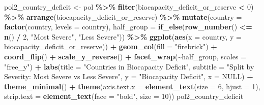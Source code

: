 \documentclass[
]{article}
\newenvironment{Shaded}{\begin{snugshade}}{\end{snugshade}}
\newcommand{\AttributeTok}[1]{\textcolor[rgb]{0.13,0.29,0.53}{#1}}
\newcommand{\ConstantTok}[1]{\textcolor[rgb]{0.56,0.35,0.01}{#1}}
\newcommand{\DecValTok}[1]{\textcolor[rgb]{0.00,0.00,0.81}{#1}}
\newcommand{\FunctionTok}[1]{\textcolor[rgb]{0.13,0.29,0.53}{\textbf{#1}}}
\newcommand{\NormalTok}[1]{#1}
\newcommand{\OtherTok}[1]{\textcolor[rgb]{0.56,0.35,0.01}{#1}}
\newcommand{\SpecialCharTok}[1]{\textcolor[rgb]{0.81,0.36,0.00}{\textbf{#1}}}
\newcommand{\StringTok}[1]{\textcolor[rgb]{0.31,0.60,0.02}{#1}}
\begin{document}
\begin{Shaded}
\begin{Highlighting}[]
\NormalTok{pol2\_country\_deficit }\OtherTok{\textless{}{-}}\NormalTok{ pol }\SpecialCharTok{\%\textgreater{}\%}
  \FunctionTok{filter}\NormalTok{(biocapacity\_deficit\_or\_reserve }\SpecialCharTok{\textless{}} \DecValTok{0}\NormalTok{) }\SpecialCharTok{\%\textgreater{}\%}
  \FunctionTok{arrange}\NormalTok{(biocapacity\_deficit\_or\_reserve) }\SpecialCharTok{\%\textgreater{}\%}
  \FunctionTok{mutate}\NormalTok{(}\AttributeTok{country =} \FunctionTok{factor}\NormalTok{(country, }\AttributeTok{levels =}\NormalTok{ country),}
         \AttributeTok{half\_group =} \FunctionTok{if\_else}\NormalTok{(}\FunctionTok{row\_number}\NormalTok{() }\SpecialCharTok{\textless{}=} \FunctionTok{n}\NormalTok{() }\SpecialCharTok{/} \DecValTok{2}\NormalTok{, }\StringTok{"Most Severe"}\NormalTok{, }\StringTok{"Less Severe"}\NormalTok{)) }\SpecialCharTok{\%\textgreater{}\%}
  \FunctionTok{ggplot}\NormalTok{(}\FunctionTok{aes}\NormalTok{(}\AttributeTok{x =}\NormalTok{ country, }\AttributeTok{y =}\NormalTok{ biocapacity\_deficit\_or\_reserve)) }\SpecialCharTok{+}
  \FunctionTok{geom\_col}\NormalTok{(}\AttributeTok{fill =} \StringTok{"firebrick"}\NormalTok{) }\SpecialCharTok{+}
  \FunctionTok{coord\_flip}\NormalTok{() }\SpecialCharTok{+}
  \FunctionTok{scale\_y\_reverse}\NormalTok{() }\SpecialCharTok{+}
  \FunctionTok{facet\_wrap}\NormalTok{(}\SpecialCharTok{\textasciitilde{}}\NormalTok{half\_group, }\AttributeTok{scales =} \StringTok{"free\_y"}\NormalTok{) }\SpecialCharTok{+}
  \FunctionTok{labs}\NormalTok{(}\AttributeTok{title =} \StringTok{"Countries in Biocapacity Deficit"}\NormalTok{,}
       \AttributeTok{subtitle =} \StringTok{"Split by Severity: Most Severe vs Less Severe"}\NormalTok{,}
       \AttributeTok{y =} \StringTok{"Biocapacity Deficit"}\NormalTok{,}
       \AttributeTok{x =} \ConstantTok{NULL}\NormalTok{) }\SpecialCharTok{+}
  \FunctionTok{theme\_minimal}\NormalTok{() }\SpecialCharTok{+}
  \FunctionTok{theme}\NormalTok{(}\AttributeTok{axis.text.x =} \FunctionTok{element\_text}\NormalTok{(}\AttributeTok{size =} \DecValTok{6}\NormalTok{, }\AttributeTok{hjust =} \DecValTok{1}\NormalTok{),}
        \AttributeTok{strip.text =} \FunctionTok{element\_text}\NormalTok{(}\AttributeTok{face =} \StringTok{"bold"}\NormalTok{, }\AttributeTok{size =} \DecValTok{10}\NormalTok{))}
\NormalTok{pol2\_country\_deficit}
\end{Highlighting}
\end{Shaded}
\end{document}
